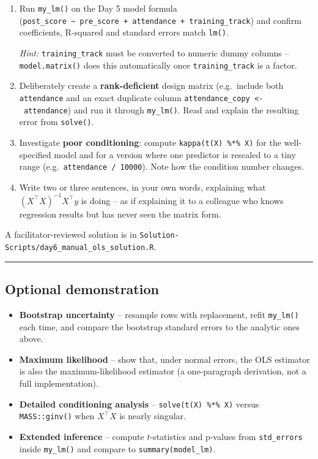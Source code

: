 \documentclass[11pt]{article}
\providecommand{\tightlist}{%
  \setlength{\itemsep}{0pt}\setlength{\parskip}{0pt}}
\begin{document}
\begin{enumerate}
\def\labelenumi{\arabic{enumi}.}
\item
  Run \texttt{my\_lm()} on the Day 5 model formula
  (\texttt{post\_score\ \textasciitilde{}\ pre\_score\ +\ attendance\ +\ training\_track})
  and confirm coefficients, R-squared and standard errors match
  \texttt{lm()}.

  \emph{Hint:} \texttt{training\_track} must be converted to numeric
  dummy columns -- \texttt{model.matrix()} does this automatically once
  \texttt{training\_track} is a factor.
\item
  Deliberately create a \textbf{rank-deficient} design matrix
  (e.g.~include both \texttt{attendance} and an exact duplicate column
  \texttt{attendance\_copy\ \textless{}-\ attendance}) and run it
  through \texttt{my\_lm()}. Read and explain the resulting error from
  \texttt{solve()}.
\item
  Investigate \textbf{poor conditioning}: compute
  \texttt{kappa(t(X)\ \%*\%\ X)} for the well-specified model and for a
  version where one predictor is rescaled to a tiny range
  (e.g.~\texttt{attendance\ /\ 10000}). Note how the condition number
  changes.
\item
  Write two or three sentences, in your own words, explaining what
  \((X^\top X)^{-1} X^\top y\) is doing -- as if explaining it to a
  colleague who knows regression results but has never seen the matrix
  form.
\end{enumerate}

A facilitator-reviewed solution is in
\texttt{Solution-Scripts/day6\_manual\_ols\_solution.R}.

\begin{center}\rule{0.5\linewidth}{0.5pt}\end{center}

\hypertarget{optional-demonstration}{%
\subsection{Optional demonstration}\label{optional-demonstration}}

\begin{itemize}
\tightlist
\item
  \textbf{Bootstrap uncertainty} -- resample rows with replacement,
  refit \texttt{my\_lm()} each time, and compare the bootstrap standard
  errors to the analytic ones above.
\item
  \textbf{Maximum likelihood} -- show that, under normal errors, the OLS
  estimator is also the maximum-likelihood estimator (a one-paragraph
  derivation, not a full implementation).
\item
  \textbf{Detailed conditioning analysis} --
  \texttt{solve(t(X)\ \%*\%\ X)} versus \texttt{MASS::ginv()} when
  \(X^\top X\) is nearly singular.
\item
  \textbf{Extended inference} -- compute \(t\)-statistics and p-values
  from \texttt{std\_errors} inside \texttt{my\_lm()} and compare to
  \texttt{summary(model\_lm)}.
\end{itemize}
\end{document}
